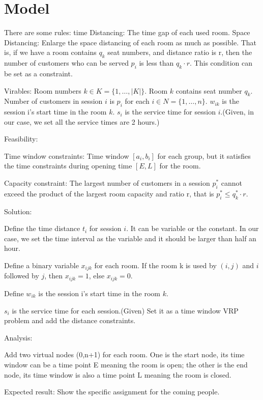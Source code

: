 \section{Model}

There are some rules: time Distancing:  The time gap of each used room. Space Distancing:  Enlarge the space distancing of each room as much as possible. That is, if we have a room contains $q_k$ seat numbers, and distance ratio is r, then the number of customers who can be served $p_i$ is less than $q_k\cdot r$.  This condition can be set as a constraint.

Virables:
Room numbers $k \in K = \{1,\ldots,|K|\}$. Room $k$ contains seat number $q_k$. Number of customers in session $i$ is $p_i$ for each $i \in N = \{1,\ldots,n\}$. $w_{ik}$ is the session i's start time in the room $k$. $s_i$ is the service time for session $i$.(Given, in our case, we set all the service times are 2 hours.)

Feasibility:

Time window constraints:
Time window $[a_{i},b_{i}]$ for each group, but it satisfies the time constraints during opening time $[E, L]$ for the room.

Capacity constraint:
The largest number of customers in a session $p_i^*$ cannot exceed the product of the largest room capacity and ratio r, that is $p_i^* \leq q_k^*\cdot r$.

Solution:

Define the time distance $t_{i}$ for session $i$. It can be variable or the constant. In our case, we set the time interval as the variable and it should be larger than half an hour.

Define a binary variable $x_{ijk}$ for each room. If the room k is used by $(i,j)$ and $i$ followed by $j$, then $x_{ijk} = 1$, else $x_{ijk} = 0$.

Define
$w_{ik}$ is the session i's start time in the room $k$.

$s_i$ is the service time for each session.(Given)
Set it as a time window VRP problem and add the distance constraints.

Analysis:

Add two virtual nodes (0,n+1) for each room. One is the start node, its time window can be a time point E meaning the room is open; the other is the end node, its time window is also a time point L meaning the room is closed.

Expected result:
Show the specific assignment for the coming people.

